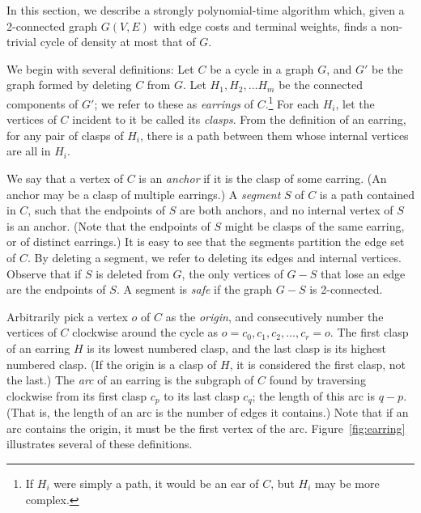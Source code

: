 \documentclass[11pt]{article}
\begin{document}
In this section, we describe a strongly polynomial-time algorithm
which, given a 2-connected graph $G(V,E)$ with edge costs and terminal
weights, finds a non-trivial cycle of density at most that of $G$.

We begin with several definitions: Let $C$ be a cycle in a graph $G$,
and $G'$ be the graph formed by deleting $C$ from $G$. Let $H_1, H_2,
\ldots H_m$ be the connected components of $G'$; we refer to these as
\emph{earrings} of $C$.\footnote{If $H_i$ were simply a path, it would be an
  ear of $C$, but $H_i$ may be more complex.}  For each $H_i$, let the
vertices of $C$ incident to it be called its \emph{clasps}. From the
definition of an earring, for any pair of clasps of $H_i$, there is a
path between them whose internal vertices are all in $H_i$. 

We say that a vertex of $C$ is an \emph{anchor} if it is the clasp of
some earring. (An anchor may be a clasp of multiple earrings.)  A
\emph{segment} $S$ of $C$ is a path contained in $C$, such that the
endpoints of $S$ are both anchors, and no internal vertex of $S$ is an
anchor. (Note that the endpoints of $S$ might be clasps of the same
earring, or of distinct earrings.) It is easy to see that the segments
partition the edge set of $C$. By deleting a segment, we refer to
deleting its edges and internal vertices. Observe that if $S$ is
deleted from $G$, the only vertices of $G - S$ that lose an edge are
the endpoints of $S$. A segment is \emph{safe} if the graph $G-S$ is
2-connected.

Arbitrarily pick a vertex $o$ of $C$ as the \emph{origin}, and
consecutively number the vertices of $C$ clockwise around the cycle as
$o = c_0, c_1, c_2, \ldots, c_r = o$. The first clasp of an earring
$H$ is its lowest numbered clasp, and the last clasp is its highest
numbered clasp. (If the origin is a clasp of $H$, it is considered the
first clasp, not the last.) The \emph{arc} of an earring is the
subgraph of $C$ found by traversing clockwise from its first clasp
$c_p$ to its last clasp $c_q$; the length of this arc is $q-p$. (That
is, the length of an arc is the number of edges it contains.) Note
that if an arc contains the origin, it must be the first vertex of the
arc.  Figure~\ref{fig:earring} illustrates several of these
definitions.
\end{document}
